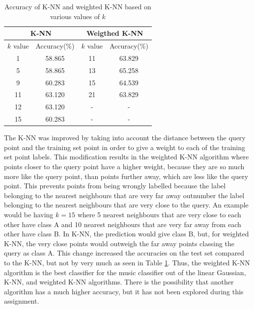 \documentclass[11pt]{scrartcl}
\begin{document}
\begin{table}[ht]
\centering
 \begin{tabular}{||c c | c c||} 
 \hline
 \multicolumn{2}{|c|}{K-NN} & \multicolumn{2}{|c|}{Weigthed K-NN}\\ 
 \hline
 $k$ value & Accuracy(\%) & $k$ value & Accuracy(\%) \\ [0.5ex] 
 \hline
 1 & 58.865 & 11 & 63.829 \\ 
 \hline
 5 & 58.865 & 13 & 65.258\\
 \hline
 9 & 60.283 & 15 & 64.539\\
 \hline
 11 & 63.120 & 21 & 63.829 \\
 \hline
 12 & 63.120 & - & - \\
 \hline
 15 & 60.283 & - & - \\ [1ex] 
 \hline
\end{tabular}
\caption{Accuracy of K-NN and weighted K-NN based on various values of $k$}
\label{table:T0}
\end{table} 

The K-NN was improved by taking into account the distance between the query point and the training set point in order to give a weight to each of the training set point labels. This modification results in the weighted K-NN algorithm where points closer to the query point have a higher weight, because they are so much more like the query point, than points further away, which are less like the query point. This prevents points from being wrongly labelled because the label belonging to the nearest neighbours that are very far away outnumber the label belonging to the nearest neighbours that are very close to the query. An example would be having $k=15$ where 5 nearest neighbours that are very close to each other have class A and 10 nearest neighbours that are very far away from each other have class B. In K-NN, the prediction would give class B, but, for weighted K-NN, the very close points would outweigh the far away points classing the query as class A. This change increased the accuracies on the test set compared to the K-NN, but not by very much as seen in Table \ref{table:T0}. Thus, the weighted K-NN algorithm is the best classifier for the music classifier out of the linear Gaussian, K-NN, and weighted K-NN algorithms. There is the possibility that another algorithm has a much higher accuracy, but it has not been explored during this assignment.
\end{document}
